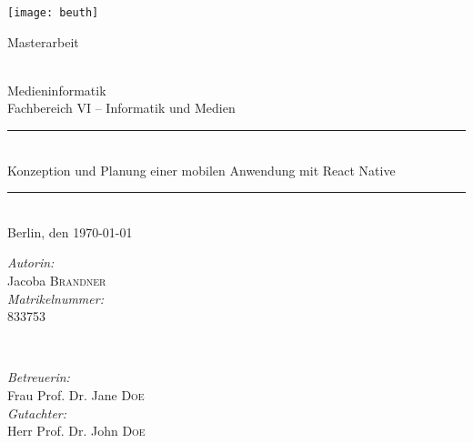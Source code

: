 \begin{titlepage}


\center %


\begin{center}
\texttt{[image: beuth]}  \\[2cm]
\end{center}

\begin{Large}
Masterarbeit
\end{Large}\\[0.4cm]
\LARGE{Medieninformatik}\\
\large{Fachbereich VI -- Informatik und Medien}\\[0.5cm]


\rule{\textwidth}{0.4pt}\\[1cm] %
{\LARGE Konzeption und Planung einer mobilen Anwendung mit React Native}\\[\baselineskip]

\rule{\textwidth}{0.4pt}\\[1cm]%

{\Large Berlin, den \today{}} %
\vfill


\begin{minipage}{0.4\textwidth}
\begin{flushleft} \large
\emph{Autorin:}\\
Jacoba \textsc{Brandner} \\
\emph{Matrikelnummer:}\\
833753
\end{flushleft}
\end{minipage}
~
\begin{minipage}{0.45\textwidth}
\begin{flushright} \large
\emph{Betreuerin:} \\
Frau Prof. Dr. Jane \textsc{Doe} \\
\emph{Gutachter:} \\
Herr Prof. Dr. John \textsc{Doe} \\
\end{flushright}
\end{minipage}


\vfill %
\end{titlepage}
